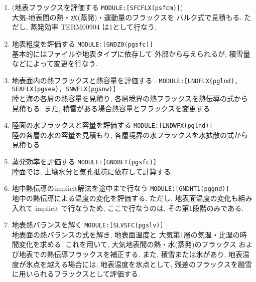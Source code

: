 \begin{enumerate}
  \item (地表フラックスを評価する \texttt{MODULE:[SFCFLX(psfcm)]}) \\
            大気-地表間の熱・水(蒸発)・運動量のフラックスを
            バルク式で見積もる.
            ただし, 蒸発効率 TERM00904 は1として行なう.

  \item 地表粗度を評価する \texttt{MODULE:[GNDZ0(pgsfc)]} \\
            基本的にはファイルや地表タイプに依存して
            外部から与えられるが, 
            積雪量などによって変更を行なう.

  \item 地表面内の熱フラックスと熱容量を評価する .
        \texttt{MODULE:[LNDFLX(pglnd), SEAFLX(pgsea), SNWFLX(pgsnw)]} \\
            陸と海の各層の熱容量を見積り,
            各層境界の熱フラックスを熱伝導の式から見積もる.
            また, 積雪がある場合熱容量とフラックスを変更する.

  \item 陸面の水フラックスと容量を評価する \texttt{MODULE:[LNDWFX(pglnd)]} \\
            陸の各層の水の容量を見積もり, 
            各層境界の水フラックスを水拡散の式から見積もる

  \item 蒸発効率を評価する \texttt{MODULE:[GNDBET(pgsfc)]} \\
            陸面では, 土壌水分と気孔抵抗に依存して計算する. 

  \item 地中熱伝導のimplicit解法を途中まで行なう \texttt{MODULE:[GNDHT1(pggnd)]} \\
            地中の熱伝導による温度の変化を評価する.
            ただし, 地表面温度の変化も組み入れて 
            implicit で行なうため, ここで行なうのは, その第1段階のみである.

  \item 地表熱バランスを解く \texttt{MODULE:[SLVSFC(pgslv)]} \\
            地表面の熱バランスの式を解き, 地表面温度と
            大気第1層の気温・比湿の時間変化を求める.
            これを用いて, 大気地表間の熱・水(蒸発)のフラックス
            および地表での熱伝導フラックスを補正する.
            また, 積雪または氷があり, 地表温度が氷点を越える場合には,
            地表温度を氷点として, 
            残差のフラックスを融雪に用いられるフラックスとして評価する.


\end{enumerate}
